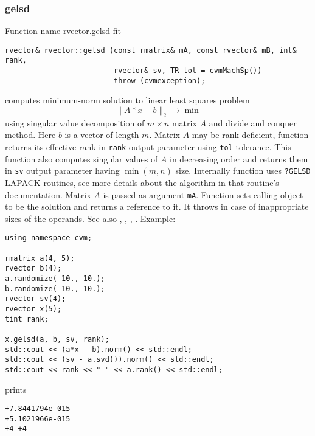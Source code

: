 \subsubsection{gelsd}
Function%
\pdfdest name {rvector.gelsd} fit
\begin{verbatim}
rvector& rvector::gelsd (const rmatrix& mA, const rvector& mB, int& rank,
                         rvector& sv, TR tol = cvmMachSp())
                         throw (cvmexception);
\end{verbatim}
computes minimum-norm solution to linear
least squares problem 
\begin{equation*}
\|A*x-b\|_2\to\min
\end{equation*}
using singular value decomposition of $m\times n$ matrix $A$
and divide and conquer method.
Here $b$ is a vector of length $m$.
Matrix $A$ may be rank-deficient, function returns 
its effective rank in \verb"rank"
output parameter using \verb"tol" tolerance.
This function also computes
singular values of $A$ in decreasing order and returns them in \verb"sv" output parameter
having $\min(m,n)$ size.
Internally function uses \verb"?GELSD" LAPACK routines, see more details
about the algorithm in that routine's documentation.
Matrix $A$ is passed as  argument \verb"mA".
Function sets calling object to be the solution and returns a reference to it.
It throws
in case of inappropriate sizes of the operands.
See also , 
, ,
.
Example:
\begin{Verbatim}
using namespace cvm;

rmatrix a(4, 5);
rvector b(4);
a.randomize(-10., 10.);
b.randomize(-10., 10.);
rvector sv(4);
rvector x(5);
tint rank;

x.gelsd(a, b, sv, rank);
std::cout << (a*x - b).norm() << std::endl;
std::cout << (sv - a.svd()).norm() << std::endl;
std::cout << rank << " " << a.rank() << std::endl;
\end{Verbatim}
prints
\begin{Verbatim}
+7.8441794e-015
+5.1021966e-015
+4 +4
\end{Verbatim}
\newpage




